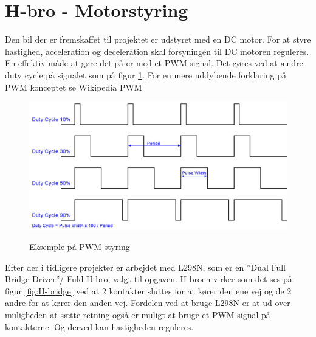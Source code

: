 
\section{H-bro - Motorstyring}

Den bil der er fremskaffet til projektet er udstyret med en DC motor. For at styre hastighed, acceleration og deceleration skal forsyningen til DC motoren reguleres. En effektiv måde at gøre det på er med et PWM signal. Det gøres ved at ændre duty cycle på signalet som på figur \ref{fig:PWMpic}. For en mere uddybende forklaring på PWM konceptet se Wikipedia PWM \cite{wikiPWM}

\begin{figure}[h]
	\centering
	\includegraphics[width=\textwidth* 6/10]{../fig/billeder/pwm_lrg}
	\label{fig:PWMpic}
	\caption{Eksemple på PWM styring}
\end{figure}

Efter der i tidligere projekter er arbejdet med L298N, som er en ''Dual Full Bridge Driver''/ Fuld H-bro, valgt til opgaven. H-broen virker som det ses på figur \ref{fig:H-bridge} ved at 2 kontakter sluttes for at kører den ene vej og de 2 andre for at kører den anden vej. Fordelen ved at bruge L298N er at ud over muligheden at sætte retning også er muligt at bruge et PWM signal på kontakterne. Og derved kan hastigheden reguleres.


